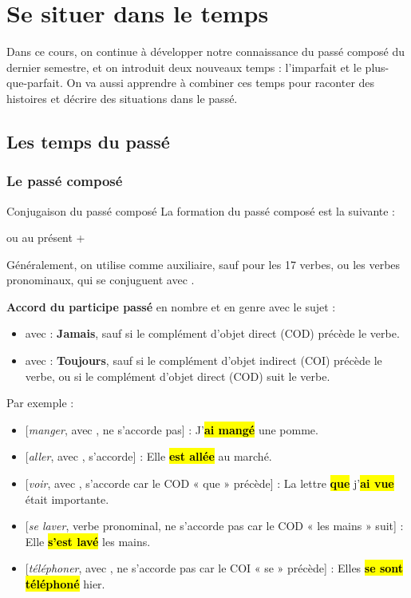 \section{Se situer dans le temps}

Dans ce cours, on continue à développer notre connaissance du passé composé du dernier semestre,
et on introduit deux nouveaux temps : l'imparfait et le plus-que-parfait. On va aussi apprendre
à combiner ces temps pour raconter des histoires et décrire des situations dans le passé.

\subsection{Les temps du passé}

\subsubsection{Le passé composé}

\begin{frbox}{Conjugaison du passé composé}
    La formation du passé composé est la suivante :

    {
        \centering
         ou  au présent + \par
    }

    Généralement, on utilise  comme auxiliaire, sauf pour les 17 verbes, ou les
    verbes pronominaux, qui se conjuguent avec .

    \textbf{Accord du participe passé} en nombre et en genre avec le sujet :
    \begin{itemize}
        \item avec  : \textbf{Jamais}, sauf si le complément d'objet direct (COD)
        précède le verbe.
        \item avec  : \textbf{Toujours},
        sauf si le complément d'objet indirect (COI) précède le verbe, ou
        si le complément d'objet direct (COD) suit le verbe.
    \end{itemize}
\end{frbox}

Par exemple :

\begin{itemize}
    \item{} [\textit{manger}, avec , ne s'accorde pas] : J'\hl{\textbf{ai mangé}} une pomme.
    \item{} [\textit{aller}, avec , s'accorde] : Elle \hl{\textbf{est allée}} au marché.
    \item{} [\textit{voir}, avec , s'accorde car le COD « que » précède] : La lettre \hl{\textbf{que}} j'\hl{\textbf{ai vue}} était importante.
    \item{} [\textit{se laver}, verbe pronominal, ne s'accorde pas car le COD « les mains » suit] : Elle \hl{\textbf{s'est lavé}} les mains.
    \item{} [\textit{téléphoner}, avec , ne s'accorde pas car le COI « se » précède] : Elles \hl{\textbf{se sont téléphoné}} hier.
\end{itemize}

